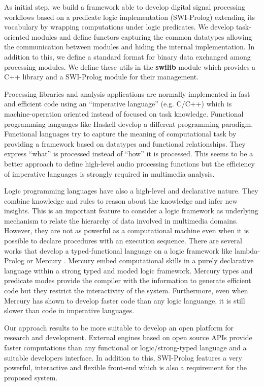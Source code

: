 \documentclass[runningheads]{llncs}
\begin{document}
As initial step, we build a framework able to develop digital signal processing workflows based on a predicate logic implementation (SWI-Prolog) extending its vocabulary by wrapping computations under logic predicates. We develop task-oriented modules and define functors capturing the common datatypes allowing the communication between modules and hiding the internal implementation. In addition to this, we define a standard format for binary data exchanged among processing modules. We define these utils in the \textbf{swilib} module which provides a C++ library and a SWI-Prolog module for their management.

Processing libraries and analysis applications are normally implemented in fast and efficient code using an ``imperative language'' (e.g. C/C++) which is machine-operation oriented instead of focused on task knowledge. Functional programming languages like Haskell \cite{haskell} develop a different programming paradigm. Functional languages try to capture the meaning of computational task by providing a framework based on datatypes and functional relationships. They express ``what'' is processed instead of ``how'' it is processed. This seems to be a better approach to define high-level audio processing functions but the efficiency of imperative languages is strongly required in multimedia analysis.

Logic programming languages have also a high-level and declarative nature. They combine knowledge and rules to reason about the knowledge and infer new insights. This is an important feature to consider a logic framework as underlying mechanism to relate the hierarchy of data involved in multimedia domains. However, they are not as powerful as a computational machine even when it is possible to declare procedures with an execution sequence. There are several works that develop a typed-functional language on a logic framework like lambda-Prolog or Mercury \cite{mercury}. Mercury embed computational skills in a purely declarative language within a strong typed and moded logic framework. Mercury types and predicate modes provide the compiler with the information to generate efficient code but they restrict the interactivity of the system. Furthermore, even when Mercury has shown to develop faster code than any logic languange, it is still slower than code in imperative languages.

Our approach results to be more suitable to develop an open platform for research and development. External engines based on open source APIs provide faster computations than any functional or logic/strong-typed language and a suitable developers interface. In addition to this, SWI-Prolog features a very powerful, interactive and flexible front-end which is also a requirement for the proposed system.
\end{document}
